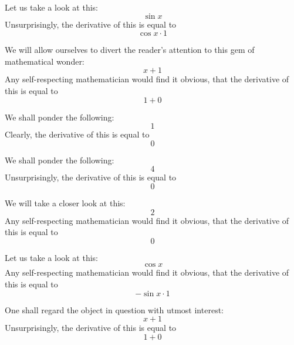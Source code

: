 \documentclass{article}
\begin{document}
Let us take a look at this:
\begin{equation}
\sin x 
\end{equation}
Unsurprisingly, the derivative of this is equal to
\begin{equation}
\cos x \cdot 1 
\end{equation}

We will allow ourselves to divert the reader's attention to this gem of mathematical wonder:
\begin{equation}
x + 1 
\end{equation}
Any self-respecting mathematician would find it obvious, that the derivative of this is equal to
\begin{equation}
1 + 0 
\end{equation}

We shall ponder the following:
\begin{equation}
1 
\end{equation}
Clearly, the derivative of this is equal to
\begin{equation}
0 
\end{equation}

We shall ponder the following:
\begin{equation}
4 
\end{equation}
Unsurprisingly, the derivative of this is equal to
\begin{equation}
0 
\end{equation}

We will take a closer look at this:
\begin{equation}
2 
\end{equation}
Any self-respecting mathematician would find it obvious, that the derivative of this is equal to
\begin{equation}
0 
\end{equation}

Let us take a look at this:
\begin{equation}
\cos x 
\end{equation}
Any self-respecting mathematician would find it obvious, that the derivative of this is equal to
\begin{equation}
-\sin x \cdot 1 
\end{equation}

One shall regard the object in question with utmost interest:
\begin{equation}
x + 1 
\end{equation}
Unsurprisingly, the derivative of this is equal to
\begin{equation}
1 + 0 
\end{equation}
\end{document}
